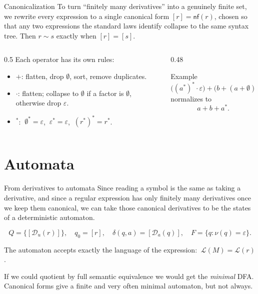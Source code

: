 \documentclass[aspectratio=169]{beamer}
\newcommand{\Dd}{\mathcal{D}}                 %
\newcommand{\eps}{\varepsilon}
\newcommand{\st}{^{*}}                         %
\begin{document}
\begin{frame}{Canonicalization}
  To turn ``finitely many derivatives'' into a genuinely finite set, we rewrite
  every expression to a single canonical form $[r]=\mathsf{nf}(r)$, chosen so
  that any two expressions the standard laws identify collapse to the same
  syntax tree. Then $r\sim s$ exactly when $[r]=[s]$.
  \vfill
  \begin{columns}[T,onlytextwidth]
    \begin{column}{0.5\textwidth}
      Each operator has its own rules:
      \begin{itemize}
        \item $+$: flatten, drop $\emptyset$, sort, remove duplicates.
        \item $\cdot$: flatten; collapse to $\emptyset$ if a factor is
              $\emptyset$, otherwise drop $\eps$.
        \item $\st$: $\ \emptyset\st=\eps$, $\ \eps\st=\eps$, $\ (r\st)\st=r\st$.
      \end{itemize}
    \end{column}
    \begin{column}{0.48\textwidth}
      \begin{block}{Example}
        \[
          \big((a\st)\st{\cdot}\eps\big)+\big(b+(a+\emptyset)\big)+b
        \]
        normalizes to
        \[
          a+b+a\st .
        \]
      \end{block}
    \end{column}
  \end{columns}
\end{frame}

\section{Automata}

\begin{frame}{From derivatives to automata}
  Since reading a symbol is the same as taking a derivative, and since a regular
  expression has only finitely many derivatives once we keep them canonical, we
  can take those canonical derivatives to be the states of a deterministic
  automaton.
  \begin{definition}
    \[
      Q=\{[\Dd_u(r)]\},\quad q_0=[r],\quad
      \delta(q,a)=[\Dd_a(q)],\quad F=\{q:\nu(q)=\eps\}.
    \]
  \end{definition}
  \begin{theorem}[Correctness]
    The automaton accepts exactly the language of the expression:
    $\ \mathcal L(M)=\mathcal L(r)$.
  \end{theorem}
  \vfill
  {\footnotesize If we could quotient by full semantic equivalence we would get
  the \emph{minimal} DFA. Canonical forms give a finite and very often minimal
  automaton, but not always.}
\end{frame}
\end{document}
